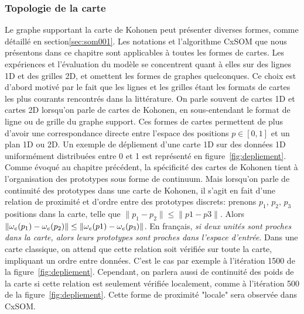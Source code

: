 \subsubsection{Topologie de la carte}
Le graphe supportant la carte de Kohonen peut présenter diverses formes, comme détaillé en section\ref{sec:som001}. Les notations et l'algorithme CxSOM que nous présentons dans ce chapitre sont applicables à toutes les formes de cartes. Les expériences et l'évaluation du modèle se concentrent quant à elles sur des lignes 1D et des grilles 2D, et omettent les formes de graphes quelconques. Ce choix est d'abord motivé par le fait que les lignes et les grilles étant les formats de cartes les plus courants rencontrés dans la littérature. On parle souvent de cartes 1D et cartes 2D lorsqu'on parle de cartes de Kohonen, en sous-entendant le format de ligne ou de grille du graphe support. Ces formes de cartes permettent de plus d'avoir une correspondance directe entre l'espace des positions $p \in [0,1]$ et un plan 1D ou 2D. Un exemple de dépliement d'une carte 1D sur des données 1D uniformément distribuées entre 0 et 1 est représenté en figure~\ref{fig:depliement}.
Comme évoqué au chapitre précédent, la spécificité des cartes de Kohonen tient à l'organisation des prototypes sous forme de continuum. Mais lorsqu'on parle de continuité des prototypes dans une carte de Kohonen, il s'agit en fait d'une relation de proximité et d'ordre entre des prototypes discrets: prenons $p_1$, $p_2$, $p_3$ positions dans la carte, telle que $\lVert p_1 - p_2 \rVert \leq \lVert p1 - p3 \rVert$. Alors $\lVert \omega_e(p_1) - \omega_e(p_2) \rVert \leq \lVert \omega_e(p1) - \omega_e(p_3) \rVert$. En français, \emph{si deux unités sont proches dans la carte, alors leurs prototypes sont proches dans l'espace d'entrée}. Dans une carte classique, on attend que cette relation soit vérifiée sur toute la carte, impliquant un ordre entre données. C'est le cas par exemple à l'itération 1500 de la figure~\ref{fig:depliement}. Cependant, on parlera aussi de continuité des poids de la carte si cette relation est seulement vérifiée localement, comme à l'itération 500 de la figure~\ref{fig:depliement}. Cette forme de proximité "locale" sera observée dans CxSOM.

